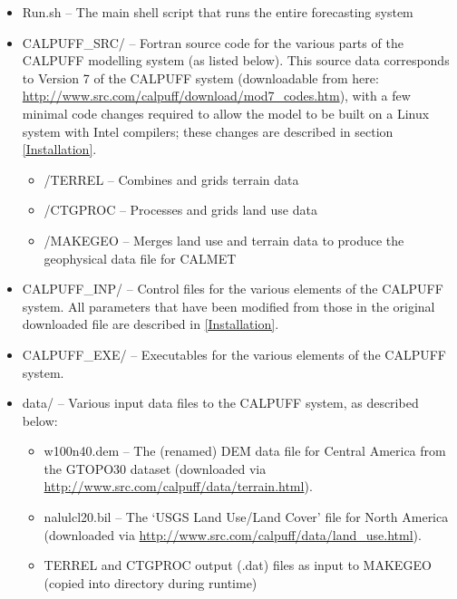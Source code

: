 \documentclass[10pt,a4paper]{article}
\begin{document}
\begin{itemize}
\item Run.sh -- The main shell script that runs the entire forecasting system
\item CALPUFF\_SRC/ -- Fortran source code for the various parts of the CALPUFF modelling system (as listed below). This source data corresponds to Version 7 of the CALPUFF system (downloadable from here: \url{http://www.src.com/calpuff/download/mod7_codes.htm}), with a few minimal code changes required to allow the model to be built on a Linux system with Intel compilers; these changes are described in section \ref{Installation}.
\begin{itemize}
\item /TERREL -- Combines and grids terrain data
\item /CTGPROC -- Processes and grids land use data
\item /MAKEGEO -- Merges land use and terrain data to produce the geophysical data file for CALMET
\end{itemize}
\item CALPUFF\_INP/ -- Control files for the various elements of the CALPUFF system. All parameters that have been modified from those in the original downloaded file are described in \ref{Installation}.
\item CALPUFF\_EXE/ -- Executables for the various elements of the CALPUFF system.
\item data/ -- Various input data files to the CALPUFF system, as described below:
\begin{itemize}
\item w100n40.dem -- The (renamed) DEM data file for Central America from the GTOPO30 dataset (downloaded via \url{http://www.src.com/calpuff/data/terrain.html}).
\item nalulcl20.bil -- The `USGS Land Use/Land Cover' file for North America (downloaded via \url{http://www.src.com/calpuff/data/land_use.html}).
\item TERREL and CTGPROC output (.dat) files as input to MAKEGEO (copied into directory during runtime)
\end{itemize}
\end{itemize}
\end{document}
